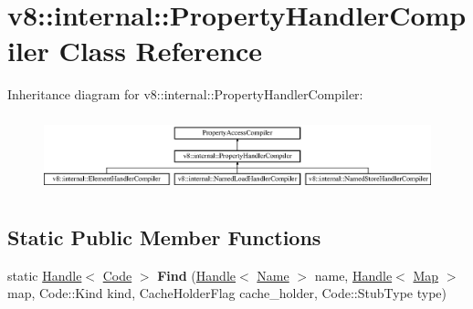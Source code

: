 \hypertarget{classv8_1_1internal_1_1_property_handler_compiler}{}\section{v8\+:\+:internal\+:\+:Property\+Handler\+Compiler Class Reference}
\label{classv8_1_1internal_1_1_property_handler_compiler}
Inheritance diagram for v8\+:\+:internal\+:\+:Property\+Handler\+Compiler\+:\begin{figure}[H]
\begin{center}
\leavevmode
\includegraphics[height=2.222222cm]{classv8_1_1internal_1_1_property_handler_compiler}
\end{center}
\end{figure}
\subsection*{Static Public Member Functions}
\begin{DoxyCompactItemize}
\item 
\hypertarget{classv8_1_1internal_1_1_property_handler_compiler_abc2933bfe634a17a62554ceac4eb481a}{}static \hyperlink{classv8_1_1internal_1_1_handle}{Handle}$<$ \hyperlink{classv8_1_1internal_1_1_code}{Code} $>$ {\bfseries Find} (\hyperlink{classv8_1_1internal_1_1_handle}{Handle}$<$ \hyperlink{classv8_1_1internal_1_1_name}{Name} $>$ name, \hyperlink{classv8_1_1internal_1_1_handle}{Handle}$<$ \hyperlink{classv8_1_1internal_1_1_map}{Map} $>$ map, Code\+::\+Kind kind, Cache\+Holder\+Flag cache\+\_\+holder, Code\+::\+Stub\+Type type)\label{classv8_1_1internal_1_1_property_handler_compiler_abc2933bfe634a17a62554ceac4eb481a}

\end{DoxyCompactItemize}
